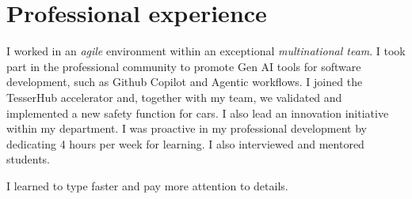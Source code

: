 %


\section{Professional experience}

{
\idea I worked in an \emph{agile} environment within an exceptional \emph{multinational team}.
\idea I took part in the professional community to promote Gen AI tools for software development, such as Github Copilot and Agentic workflows.
\idea I joined the TesserHub accelerator and, together with my team, we validated and implemented a new safety function for cars. I also lead an innovation initiative within my department.
\idea I was proactive in my professional development by dedicating 4 hours per week for learning. I also interviewed and mentored students.
}

{
\idea I learned to type faster and pay more attention to details.
}